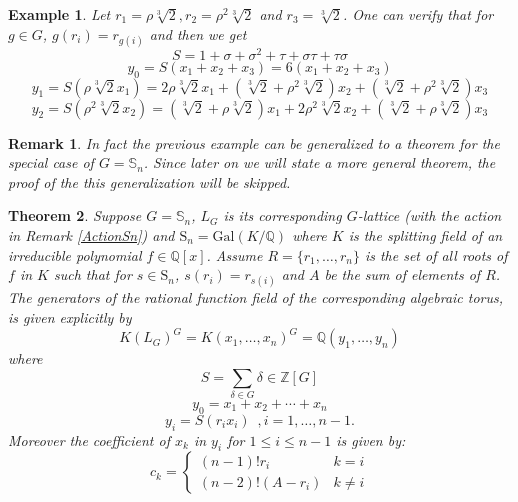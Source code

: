 \documentclass[12pt]{article}
\theoremstyle{plain}
\newtheorem{theorem}{Theorem}
\newtheorem{example}[theorem]{Example}
\newtheorem*{remark}{Remark}
\newcommand{\Z}{\ensuremath{\mathbb{Z}}}
\newcommand{\Q}{\ensuremath{\mathbb{Q}}}
\begin{document}
\begin{example}

Let $r_1 = \rho \sqrt[3]{2}, r_2 = \rho^2 \sqrt[3]{2}$ and $r_3 = \sqrt[3]{2}$. One can verify that for $g \in G$, $g(r_i) = r_{g(i)}$ and then we get
 $$S= 1+\sigma +\sigma^2 +\tau +\sigma \tau +\tau \sigma $$
 $$y_0 = S(x_1+ x_2 + x_3)= 6(x_1+x_2+x_3)$$
 $$ y_1 = S(\rho \sqrt[3]{2} x_1) = 2\rho\sqrt[3]{2}x_1+(\sqrt[3]{2}+\rho^2 \sqrt[3]{2})x_2 + (\sqrt[3]{2}+\rho^2 \sqrt[3]{2})x_3 $$
 $$ y_2 = S(\rho^2\sqrt[3]{2}x_2) = (\sqrt[3]{2}+\rho \sqrt[3]{2})x_1 + 2\rho^2\sqrt[3]{2}x_2 + (\sqrt[3]{2}+\rho \sqrt[3]{2})x_3$$
 \end{example}
\begin{remark}
In fact the previous example can be generalized to a theorem for the special case of $G = \mathbb{S}_n$. Since later on we will state a more general theorem, the proof of the this generalization will be skipped.
\end{remark}
\begin{theorem}\label{specialcase}
Suppose $G = \mathbb{S}_n$, $L_G$ is its corresponding $G$-lattice (with the action in Remark \ref{ActionSn}) and $ \mathrm{S}_n = \mathrm{Gal}(K/\Q)$ where $K$ is the splitting field of an irreducible polynomial $ f \in \Q[x]$. Assume $R = \lbrace r_1, \ldots, r_n \rbrace$ is the set of all roots of $f$ in $K$ such that for $s \in \mathrm{S}_n$, $s(r_i) = r_{s(i)}$ and $A$ be the sum of elements of $R$. The generators of the rational function field of the corresponding algebraic torus, is given explicitly by$$K(L_G)^G = K(x_1, \ldots, x_n)^G = \Q(y_1, \ldots, y_n) $$ where $$S= \sum_{\delta \in G} \delta \in \Z[G]$$
$$y_0 = x_1+ x_2+ \cdots + x_n$$
 $$ y_i = S(r_ix_i) \,\,\, , i = 1, \ldots, n-1.$$ 
Moreover the coefficient of $x_k$ in $y_i$ for $1 \leq i \leq n-1$ is given by:$$  c_k = \begin{cases} (n-1)!r_i & k=i \\ (n-2)!(A-r_i) & k\neq i \end{cases}$$
\end{theorem}
\end{document}
